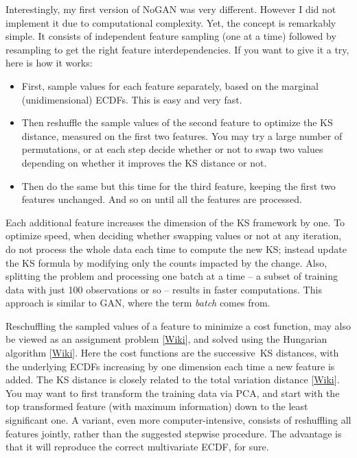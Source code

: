 \documentclass[oneside,10pt]{book}
\begin{document}
Interestingly, my first version of NoGAN was very different. However I did not implement it due to computational complexity. Yet, the concept is remarkably simple. It consists of independent feature sampling (one at a time) followed by resampling to get the right feature interdependencies. If you want to give it a try, here is how it works: \vspace{1ex}
\begin{itemize}
\item First, sample values for each feature separately, based on the marginal (unidimensional) ECDFs. This is easy and very fast. 
\item Then reshuffle the sample values of the second feature to optimize the KS distance, measured on the first two features.
 You may try a large number of permutations,  or at each step decide whether or not to swap two values depending on whether it improves the KS distance or not. 
\item Then do the same but this time for the third feature, keeping the first two features unchanged. And so on until all the features are processed.  
\end{itemize}\vspace{1ex}
Each additional feature increases the
 dimension of the KS framework by one. To optimize speed, when deciding whether swapping values or not at any iteration, do not process the whole data each time to compute the new KS; instead update the KS formula by modifying 
 only the counts impacted by the change. Also, splitting the problem and processing one \textcolor{index}{batch} at a time -- a subset of training data with just 100 observations or so -- results in faster computations. This approach is similar to GAN, where the term {\em batch} comes from. 

Reschuffling the sampled values of a feature to minimize a cost function, may also be viewed as an \textcolor{index}{assignment problem} [\href{https://en.wikipedia.org/wiki/Assignment_problem}{Wiki}], and solved using the \textcolor{index}{Hungarian algorithm} [\href{https://en.wikipedia.org/wiki/Hungarian_algorithm}{Wiki}]. Here the cost functions are the successive~KS distances, with the underlying ECDFs increasing by one dimension each time a new feature is added.  The KS
 distance is closely related to the \textcolor{index}{total variation distance}
 [\href{https://en.wikipedia.org/wiki/Total_variation_distance_of_probability_measures}{Wiki}].  
You may want to first transform the training data via PCA, and start with the top transformed feature (with maximum
 information) down to the least significant one.
 A variant, even more computer-intensive, consists of reshuffling all features jointly, rather than the suggested stepwise procedure. The advantage is that it will reproduce the correct multivariate ECDF, for sure. 
\end{document}
